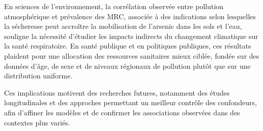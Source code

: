 En sciences de l'environnement, la corrélation observée entre pollution atmosphérique et prévalence des MRC, associée à des indications selon lesquelles la sécheresse peut accroître la mobilisation de l'arsenic dans les sols et l'eau, souligne la nécessité d'étudier les impacts indirects du changement climatique sur la santé respiratoire. En santé publique et en politiques publiques, ces résultats plaident pour une allocation des ressources sanitaires mieux ciblée, fondée sur des données d'âge, de sexe et de niveaux régionaux de pollution plutôt que sur une distribution uniforme.

Ces implications motivent des recherches futures, notamment des études longitudinales et des approches permettant un meilleur contrôle des confondeurs, afin d'affiner les modèles et de confirmer les associations observées dans des contextes plus variés.
